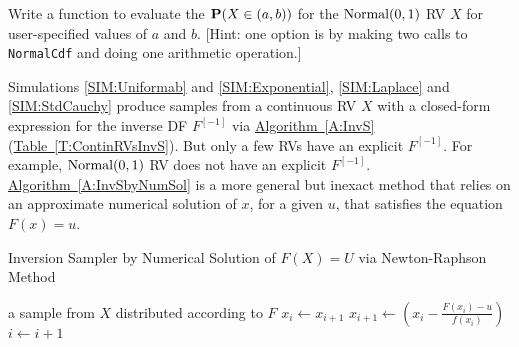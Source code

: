 \begin{labwork}\label{LW:NormalIntervalProb}
Write a function to evaluate the $\mathbf{P}(X \in (a,b))$ for the $\mbox{{\rm Normal}}(0,1)$ RV $X$ for user-specified values of $a$ and $b$. [Hint: one option is by making two calls to {\tt NormalCdf} and doing one arithmetic operation.]
\end{labwork}

Simulations \ref*{SIM:Uniformab} and \ref*{SIM:Exponential}, \ref*{SIM:Laplace} and \ref*{SIM:StdCauchy}
produce samples from a continuous RV $X$ with a closed-form expression for the inverse DF $F^{[-1]}$ via \hyperref[A:InvS]{Algorithm~\ref*{A:InvS}} (\hyperref[T:ContinRVsInvS]{Table~\ref*{T:ContinRVsInvS}}).  But only a few RVs have an explicit $F^{[-1]}$.  For example, $\mbox{{\rm Normal}}(0,1)$ RV does not have an explicit $F^{[-1]}$.
\hyperref[A:InvSbyNumSol]{Algorithm~\ref*{A:InvSbyNumSol}} is a more general but inexact method that relies on an approximate numerical solution of $x$, for a given $u$, that satisfies the equation $F(x)=u$.

\begin{algorithm}
\caption{Inversion Sampler by Numerical Solution of $F(X)=U$ via Newton-Raphson Method}
\label{A:InvSbyNumSol}
\begin{algorithmic}[1]
 a sample from $X$ distributed according to $F$
\STATE $x_i \gets x_{i+1}$
\STATE $x_{i+1} \gets \left( x_{i} - \frac{F(x_i)-u}{f(x_i)} \right)$
\STATE $i \gets i+1$
\ENDWHILE
{}
\end{algorithmic}
\end{algorithm}

